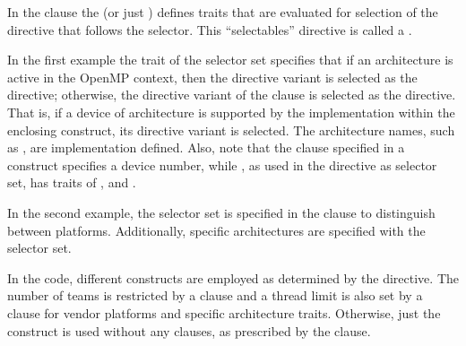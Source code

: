 In the  clause the  (or just ) defines traits that are
evaluated for selection of the directive that follows the selector. 
This ``selectables'' directive is called a .

In the first example the  trait of the
 selector set specifies that if an  architecture is
active in the OpenMP context, then the 
directive variant is selected as the directive; otherwise, the 
directive variant of the  clause is selected as the directive.
That is, if a device of  architecture is supported by the implementation within
the enclosing  construct, its directive variant is selected.
The architecture names, such as , are implementation defined.
Also, note that the  clause specified in a  construct specifies
a device number, while , as used in the 
directive as selector set, has traits of ,  and .



\pagebreak

In the second example, the  selector set is specified
in the  clause to distinguish between platforms. 
Additionally, specific architectures are specified with the 
selector set.

In the code, different  constructs are employed as determined
by the  directive.
The number of teams is restricted by a  clause
and a thread limit is also set by a  clause for 
vendor platforms and specific architecture
traits.  Otherwise, just the  construct is used without
any clauses, as prescribed by the  clause.






